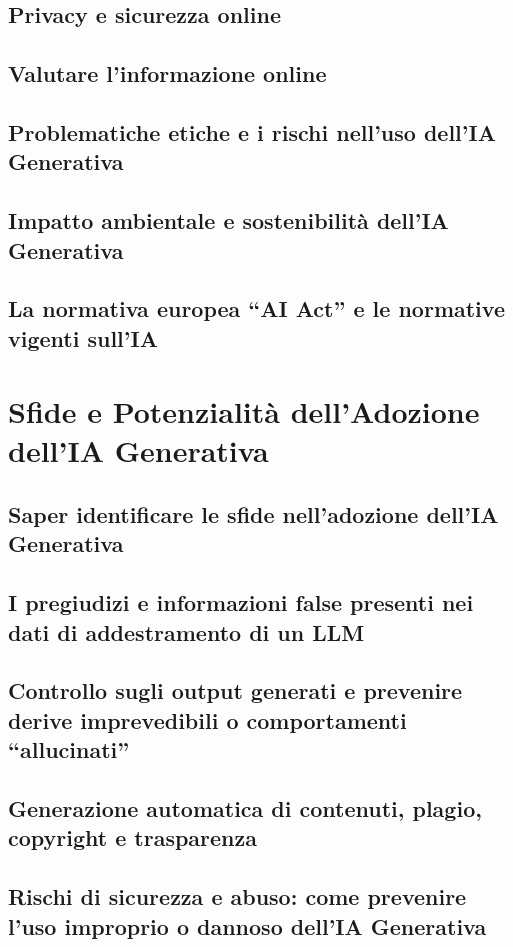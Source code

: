     \subsection{Privacy e sicurezza online}
    \subsection{Valutare l’informazione online}
    \subsection{Problematiche etiche e i rischi nell'uso dell’IA Generativa}
    \subsection{Impatto ambientale e sostenibilità dell’IA Generativa}
    \subsection{La normativa europea ``AI Act'' e le normative vigenti sull’IA}

\section{Sfide e Potenzialità dell'Adozione dell'IA Generativa}
    \subsection{Saper identificare le sfide nell'adozione dell'IA Generativa}
    \subsection{I pregiudizi e informazioni false presenti nei dati di addestramento di un LLM}
    \subsection{Controllo sugli output generati e prevenire derive imprevedibili o comportamenti ``allucinati''}
    \subsection{Generazione automatica di contenuti, plagio, copyright e trasparenza}
    \subsection{Rischi di sicurezza e abuso: come prevenire l'uso improprio o dannoso dell'IA Generativa}
